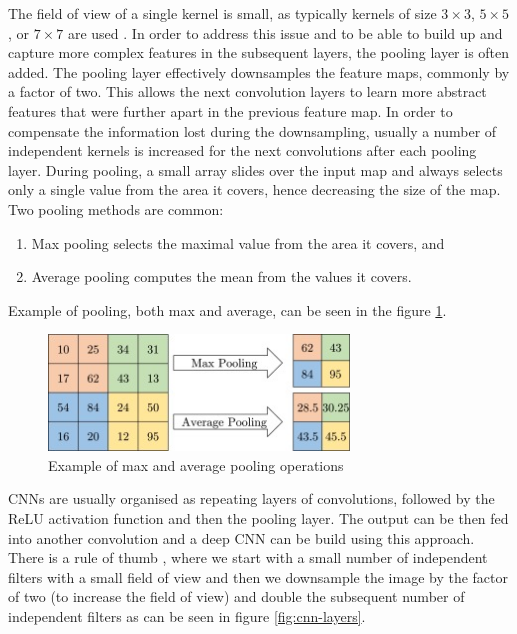 The field of view of a single kernel is small, as typically kernels of size $3\times3$, $5\times5$, or $7\times7$ are used \cite{Santosh2022-2}. In order to address this issue and to be able to build up and capture more complex features in the subsequent layers, the pooling layer is often added. The pooling layer effectively downsamples the feature maps, commonly by a factor of two. This allows the next convolution layers to learn more abstract features that were further apart in the previous feature map. In order to compensate the information lost during the downsampling, usually a number of independent kernels is increased for the next convolutions after each pooling layer. During pooling, a small array slides over the input map and always selects only a single value from the area it covers, hence decreasing the size of the map. Two pooling methods are common:

\begin{enumerate}
    \item Max pooling selects the maximal value from the area it covers, and
    \item Average pooling computes the mean from the values it covers.
\end{enumerate}

Example of pooling, both max and average, can be seen in the figure \ref{fig:pooling}.

\begin{figure}[H]
\begin{centering}
\includegraphics[width=8cm]{assets/images/pooling.jpg}
\par\end{centering}
\caption{Example of max and average pooling operations \cite{Santosh2022-2}}
\label{fig:pooling}
\end{figure}

CNNs are usually organised as repeating layers of convolutions, followed by the ReLU activation function and then the pooling layer. The output can be then fed into another convolution and a deep CNN can be build using this approach. There is a rule of thumb \cite{Santosh2022-3}, where we start with a small number of independent filters with a small field of view and then we downsample the image by the factor of two (to increase the field of view) and double the subsequent number of independent filters as can be seen in figure \ref{fig:cnn-layers}.

